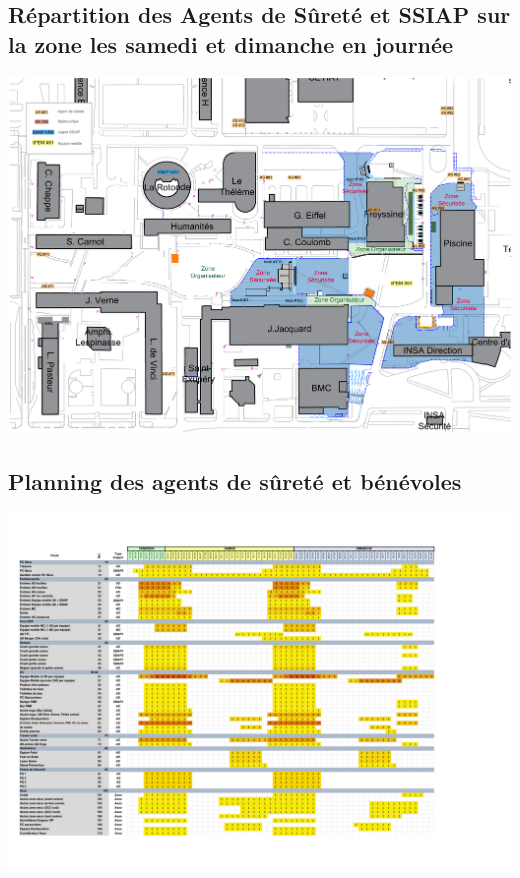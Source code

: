 \documentclass[hidelinks, paper=a4, fontsize=13pt]{report}
\begin{document}
\subsection{Répartition des Agents de Sûreté et SSIAP sur la zone les samedi et dimanche en journée}
\label{refRepartitionAgentsDeSureteJournee}
\begin{center}
	\includegraphics[width=\textwidth,keepaspectratio, angle=90]{Exports/Plan_24h_44eme-AS_Jour}
\end{center}


\subsection{Planning des agents de sûreté et bénévoles}
\label{refPlanningDesAgentsDeSurete}

\begin{center}

	\includegraphics[width=1.2\textwidth,keepaspectratio, angle=90]{Exports/Planning_AS}
\end{center}
\end{document}
